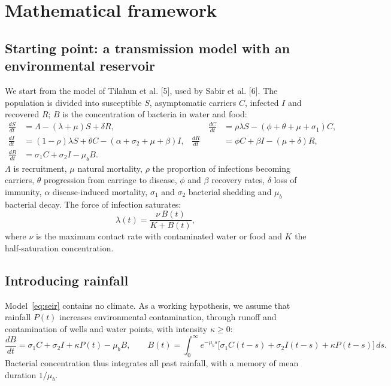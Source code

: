 \documentclass[11pt]{article}
\begin{document}
\section{Mathematical framework}
\subsection{Starting point: a transmission model with an environmental reservoir}
We start from the model of Tilahun et al. [5], used by Sabir et al. [6]. The population is divided into susceptible $S$, asymptomatic carriers $C$, infected $I$ and recovered $R$; $B$ is the concentration of bacteria in water and food:
\begin{equation}
\begin{aligned}
\frac{dS}{dt}&=\Lambda-(\lambda+\mu)S+\delta R, &\qquad \frac{dC}{dt}&=\rho\lambda S-(\phi+\theta+\mu+\sigma_1)C,\\
\frac{dI}{dt}&=(1-\rho)\lambda S+\theta C-(\alpha+\sigma_2+\mu+\beta)I, & \frac{dR}{dt}&=\phi C+\beta I-(\mu+\delta)R,\\
\frac{dB}{dt}&=\sigma_1 C+\sigma_2 I-\mu_b B .
\end{aligned}
\label{eq:seir}
\end{equation}
$\Lambda$ is recruitment, $\mu$ natural mortality, $\rho$ the proportion of infections becoming carriers, $\theta$ progression from carriage to disease, $\phi$ and $\beta$ recovery rates, $\delta$ loss of immunity, $\alpha$ disease-induced mortality, $\sigma_1$ and $\sigma_2$ bacterial shedding and $\mu_b$ bacterial decay. The force of infection saturates:
\begin{equation}
\lambda(t)=\frac{\nu\,B(t)}{K+B(t)} ,
\label{eq:lambda}
\end{equation}
where $\nu$ is the maximum contact rate with contaminated water or food and $K$ the half-saturation concentration.

\subsection{Introducing rainfall}
Model~\eqref{eq:seir} contains no climate. As a working hypothesis, we assume that rainfall $P(t)$ increases environmental contamination, through runoff and contamination of wells and water points, with intensity $\kappa\ge0$:
\begin{equation}
\frac{dB}{dt}=\sigma_1 C+\sigma_2 I+\kappa P(t)-\mu_b B,
\qquad
B(t)=\int_0^{\infty}e^{-\mu_b s}\big[\sigma_1C(t-s)+\sigma_2I(t-s)+\kappa P(t-s)\big]\,ds .
\label{eq:pluie}
\end{equation}
Bacterial concentration thus integrates all past rainfall, with a memory of mean duration $1/\mu_b$.
\end{document}
